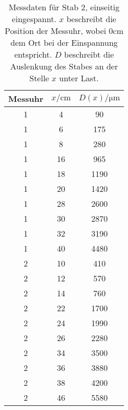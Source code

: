 \begin{table}
	\centering
	\caption{Messdaten für Stab 2, einseitig eingespannt. $x$ beschreibt
	die Position der Messuhr, wobei $0\si{\centi\meter}$
	dem Ort bei der Einspannung entspricht.
	$D$ beschreibt die Auslenkung des Stabes an der Stelle $x$ unter Last.}
	\begin{tabular}{c c c}
	\toprule
	Messuhr &
	$x / \si{\centi\meter}$ &
	$D(x) / \si{\micro\meter}$
	\\
	\midrule
	1 & 4 & 90 \\
	1 & 6 & 175 \\
	1 & 8 & 280 \\
	1 & 16 & 965 \\
	1 & 18 & 1190 \\
	1 & 20 & 1420 \\
	1 & 28 & 2600 \\
	1 & 30 & 2870 \\
	1 & 32 & 3190 \\
	1 & 40 & 4480 \\
	2 & 10 & 410 \\
	2 & 12 & 570 \\
	2 & 14 & 760 \\
	2 & 22 & 1700 \\
	2 & 24 & 1990 \\
	2 & 26 & 2280 \\
	2 & 34 & 3500 \\
	2 & 36 & 3880 \\
	2 & 38 & 4200 \\
	2 & 46 & 5580 \\
	\bottomrule
\end{tabular}
\end{table}
